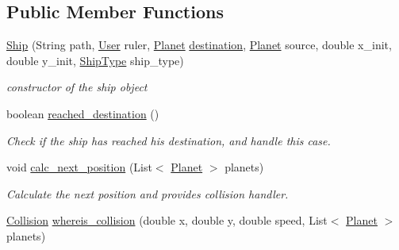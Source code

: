 \subsection*{Public Member Functions}
\begin{DoxyCompactItemize}
\item 
\hyperlink{classfr_1_1groupe40_1_1projet_1_1model_1_1ships_1_1_ship_a50b240c8ac54e3944b63208c5df4cb91}{Ship} (String path, \hyperlink{classfr_1_1groupe40_1_1projet_1_1client_1_1_user}{User} ruler, \hyperlink{classfr_1_1groupe40_1_1projet_1_1model_1_1planets_1_1_planet}{Planet} \hyperlink{classfr_1_1groupe40_1_1projet_1_1model_1_1ships_1_1_ship_a19eb504f8a0c0e263aff1e85e5e7557a}{destination}, \hyperlink{classfr_1_1groupe40_1_1projet_1_1model_1_1planets_1_1_planet}{Planet} source, double x\+\_\+init, double y\+\_\+init, \hyperlink{classfr_1_1groupe40_1_1projet_1_1model_1_1ships_1_1_ship_type}{Ship\+Type} ship\+\_\+type)
\begin{DoxyCompactList}\small\item\em constructor of the ship object \end{DoxyCompactList}\item 
\mbox{\label{classfr_1_1groupe40_1_1projet_1_1model_1_1ships_1_1_ship_a4526f55c2d198ce47e0f64b924ec6b43}} 
boolean \hyperlink{classfr_1_1groupe40_1_1projet_1_1model_1_1ships_1_1_ship_a4526f55c2d198ce47e0f64b924ec6b43}{reached\+\_\+destination} ()
\begin{DoxyCompactList}\small\item\em Check if the ship has reached his destination, and handle this case. \end{DoxyCompactList}\item 
void \hyperlink{classfr_1_1groupe40_1_1projet_1_1model_1_1ships_1_1_ship_adfd10eb0bb2fe81b8612a9da7acc8148}{calc\+\_\+next\+\_\+position} (List$<$ \hyperlink{classfr_1_1groupe40_1_1projet_1_1model_1_1planets_1_1_planet}{Planet} $>$ planets)
\begin{DoxyCompactList}\small\item\em Calculate the next position and provides collision handler. \end{DoxyCompactList}\item 
\hyperlink{enumfr_1_1groupe40_1_1projet_1_1util_1_1constants_1_1_collision}{Collision} \hyperlink{classfr_1_1groupe40_1_1projet_1_1model_1_1ships_1_1_ship_af8015208641d46aa77545db2cc71c149}{whereis\+\_\+collision} (double x, double y, double speed, List$<$ \hyperlink{classfr_1_1groupe40_1_1projet_1_1model_1_1planets_1_1_planet}{Planet} $>$ planets)

\end{DoxyCompactItemize}
